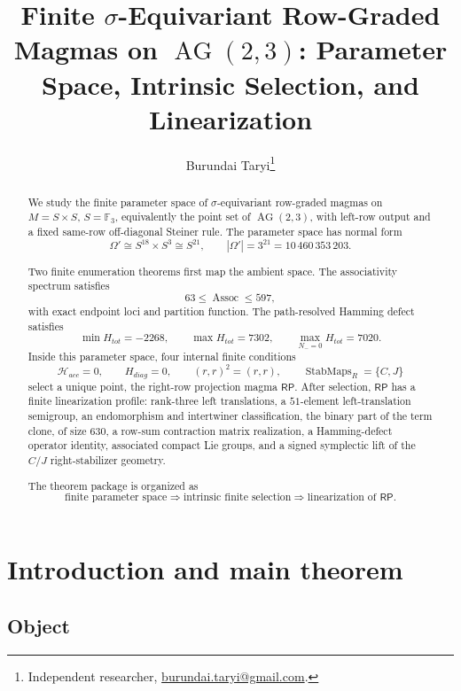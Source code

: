 \documentclass[11pt]{article}
\title{Finite \(\sigma\)-Equivariant Row-Graded Magmas on \(\operatorname{AG}(2,3)\): Parameter Space, Intrinsic Selection, and Linearization}
\author{Burundai Taryi\thanks{Independent researcher, \href{mailto:burundai.taryi@gmail.com}{burundai.taryi@gmail.com}.}}
\date{}
\theoremstyle{definition}
\newcommand{\RP}{\mathsf{RP}}
\begin{document}
\maketitle

\begin{abstract}
We study the finite parameter space of \(\sigma\)-equivariant row-graded magmas on
\(M=S\times S\), \(S=\mathbb F_3\), equivalently the point set of
\(\operatorname{AG}(2,3)\), with left-row output and a fixed same-row
off-diagonal Steiner rule.  The parameter space has normal form
\[
\Omega'\cong S^{18}\times S^3\cong S^{21},
\qquad |\Omega'|=3^{21}=10\,460\,353\,203.
\]

Two finite enumeration theorems first map the ambient space.  The associativity spectrum
satisfies
\[
63\le \operatorname{Assoc}\le 597,
\]
with exact endpoint loci and partition function.  The path-resolved Hamming
defect satisfies
\[
\min H_{tot}=-2268,
\qquad
\max H_{tot}=7302,
\qquad
\max_{N_-=0}H_{tot}=7020.
\]
Inside this parameter space, four internal finite conditions
\[
\mathcal H_{acc}=0,
\qquad
H_{diag}=0,
\qquad
(r,r)^2=(r,r),
\qquad
\operatorname{StabMaps}_{R}=\{C,J\}
\]
select a unique point, the right-row projection magma \(\RP\).  After
selection, \(\RP\) has a finite linearization profile: rank-three left
translations, a \(51\)-element left-translation semigroup, an endomorphism
and intertwiner classification, the binary part of the term clone, of size \(630\), a
row-sum contraction matrix realization, a Hamming-defect operator identity,
associated compact Lie groups, and a signed symplectic lift of the \(C/J\) right-stabilizer geometry.

The theorem package is organized as
\[
\text{finite parameter space}
\Longrightarrow
\text{intrinsic finite selection}
\Longrightarrow
\text{linearization of }\RP.
\]
\end{abstract}

\tableofcontents
\newpage

\section*{Introduction and main theorem}
\label{introduction-main-theorem}


\subsection*{Object}\label{intro-object}
\end{document}
